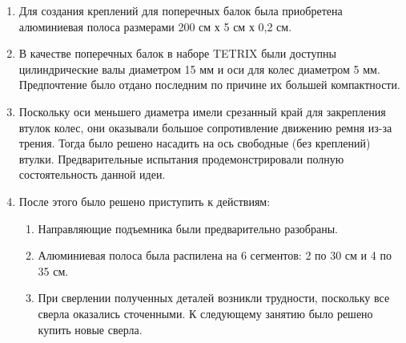 \begin{enumerate}
\begin{enumerate}
      \item  Для создания креплений для поперечных балок была приобретена алюминиевая полоса размерами 200 см х 5 см х 0,2 см.\newline
      
      \item В качестве поперечных балок в наборе TETRIX были доступны цилиндрические валы диаметром 15 мм и оси для колес диаметром 5 мм. Предпочтение было отдано последним по причине их большей компактности.\newline
       
      \item Поскольку оси меньшего диаметра имели срезанный край для закрепления втулок колес, они оказывали большое сопротивление движению ремня из-за трения. Тогда было решено насадить на ось свободные (без креплений) втулки. Предварительные испытания продемонстрировали полную состоятельность данной идеи.\newline
        
      \item После этого было решено приступить к действиям:\newline
      \begin{enumerate}
      	\item Направляющие подъемника были предварительно разобраны.\newline
      	
      	\item  Алюминиевая полоса была распилена на 6 сегментов: 2 по 30 см и 4 по 35 см.\newline
      	
      	\item При сверлении полученных деталей возникли трудности, поскольку все сверла оказались сточенными. К следующему занятию было решено купить новые сверла.\newline
      	

\end{enumerate}
\end{enumerate}
\end{enumerate}
